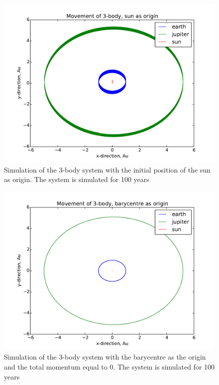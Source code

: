 \begin{figure}[H]

	\includegraphics[width=0.9\linewidth]{../results/plots/3body_nobary}
	\caption{Simulation of the 3-body system with the initial position of the sun as origin. The system is simulated for 100 years }
	\label{fig:3bodynobary}
\end{figure}


\begin{figure}[H]
	\centering
	\includegraphics[width=0.9\linewidth]{../results/plots/3body_bary}
	\caption{Simulation of the 3-body system with the barycentre as the origin and the total momentum equal to $ 0 $. The system is simulated for 100 years }
	\label{fig:3bodybary}
\end{figure}


